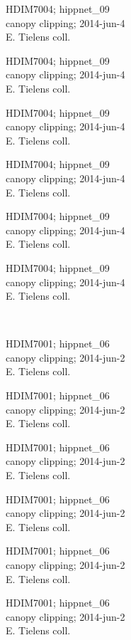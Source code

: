 \documentclass[2pt]{extarticle}
\begin{document}
\noindent
\parbox{0.16\textwidth}{\tiny \raggedright \rule[-0.3\baselineskip]{0pt}{10pt}HDIM7004; hippnet\_09\\ canopy clipping; 2014-jun-4\\ E. Tielens coll.}
\parbox{0.16\textwidth}{\tiny \raggedright \rule[-0.3\baselineskip]{0pt}{10pt}HDIM7004; hippnet\_09\\ canopy clipping; 2014-jun-4\\ E. Tielens coll.}
\parbox{0.16\textwidth}{\tiny \raggedright \rule[-0.3\baselineskip]{0pt}{10pt}HDIM7004; hippnet\_09\\ canopy clipping; 2014-jun-4\\ E. Tielens coll.}
\parbox{0.16\textwidth}{\tiny \raggedright \rule[-0.3\baselineskip]{0pt}{10pt}HDIM7004; hippnet\_09\\ canopy clipping; 2014-jun-4\\ E. Tielens coll.}
\parbox{0.16\textwidth}{\tiny \raggedright \rule[-0.3\baselineskip]{0pt}{10pt}HDIM7004; hippnet\_09\\ canopy clipping; 2014-jun-4\\ E. Tielens coll.}
\parbox{0.16\textwidth}{\tiny \raggedright \rule[-0.3\baselineskip]{0pt}{10pt}HDIM7004; hippnet\_09\\ canopy clipping; 2014-jun-4\\ E. Tielens coll.} \\ 
\vspace{0.001in} 

\noindent
\parbox{0.16\textwidth}{\tiny \raggedright \rule[-0.3\baselineskip]{0pt}{10pt}HDIM7001; hippnet\_06\\ canopy clipping; 2014-jun-2\\ E. Tielens coll.}
\parbox{0.16\textwidth}{\tiny \raggedright \rule[-0.3\baselineskip]{0pt}{10pt}HDIM7001; hippnet\_06\\ canopy clipping; 2014-jun-2\\ E. Tielens coll.}
\parbox{0.16\textwidth}{\tiny \raggedright \rule[-0.3\baselineskip]{0pt}{10pt}HDIM7001; hippnet\_06\\ canopy clipping; 2014-jun-2\\ E. Tielens coll.}
\parbox{0.16\textwidth}{\tiny \raggedright \rule[-0.3\baselineskip]{0pt}{10pt}HDIM7001; hippnet\_06\\ canopy clipping; 2014-jun-2\\ E. Tielens coll.}
\parbox{0.16\textwidth}{\tiny \raggedright \rule[-0.3\baselineskip]{0pt}{10pt}HDIM7001; hippnet\_06\\ canopy clipping; 2014-jun-2\\ E. Tielens coll.}
\parbox{0.16\textwidth}{\tiny \raggedright \rule[-0.3\baselineskip]{0pt}{10pt}HDIM7001; hippnet\_06\\ canopy clipping; 2014-jun-2\\ E. Tielens coll.} \\ 
\vspace{0.001in} 
\end{document}
